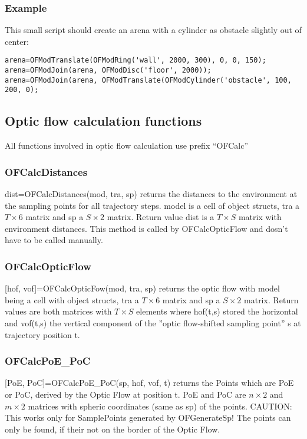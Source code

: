 \documentclass[a4paper]{article}
\begin{document}
\subsubsection{Example}

This small script should create an arena with a cylinder as obstacle
slightly out of center:

\begin{verbatim}
arena=OFModTranslate(OFModRing('wall', 2000, 300), 0, 0, 150);
arena=OFModJoin(arena, OFModDisc('floor', 2000));
arena=OFModJoin(arena, OFModTranslate(OFModCylinder('obstacle', 100, 200, 0);
\end{verbatim}

\subsection{Optic flow calculation functions}

All functions involved in optic flow calculation use prefix ``OFCalc''

\subsubsection{OFCalcDistances}

dist=OFCalcDistances(mod, tra, sp) returns the distances to the
environment at the sampling points for all trajectory steps.  model is
a cell of object structs, tra a $T \times 6$ matrix and sp a $S \times
2$ matrix. Return value dist is a $T \times S$ matrix with environment
distances.
This method is called by OFCalcOpticFlow and dosn't have to be called manually.

\subsubsection{OFCalcOpticFlow}

[hof, vof]=OFCalcOpticFow(mod, tra, sp) returns the optic flow with
model being a cell with object structs, tra a $T \times 6$ matrix and
sp a $S \times 2$ matrix. Return values are both matrices with $T
\times S$ elements where hof(t,s) stored the horizontal and vof(t,s) the
vertical component of the ''optic flow-shifted sampling point'' s at
trajectory position t.

\subsubsection{OFCalcPoE\_PoC}

[PoE, PoC]=OFCalcPoE\_PoC(sp, hof, vof, t) returns the Points which are PoE or PoC, derived by the Optic Flow at position t. PoE and PoC are $n \times 2$ and $m \times 2$ matrices with spheric coordinates (same as sp) of the points.\newline
CAUTION: This works only for SamplePoints generated by OFGenerateSp!
The points can only be found, if their not on the border of the Optic Flow.
\end{document}
